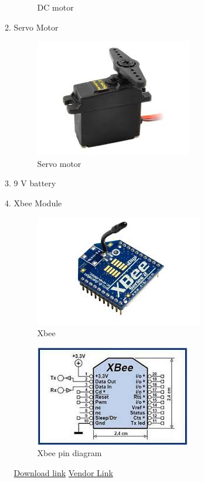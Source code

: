 \documentclass[a4paper,12pt,oneside]{book}
\begin{document}
\begin{itemize}
\begin{enumerate}
\begin{figure}[H]
        \caption{DC motor}
      \end{figure}
      \item Servo Motor
      \begin{figure}[H]
        \centering
        \includegraphics[scale=0.6]{servo}
        \caption{Servo motor}
      \end{figure}
      \item 9 V battery
      \item Xbee Module  \\
      \begin{figure}[H]
        \centering
        \includegraphics[scale=0.6]{Xbee-1}
        \caption{Xbee}
      \end{figure}
      \begin{figure}[H]
        \centering
        \includegraphics[scale=0.6]{Xbee}
        \caption{Xbee pin diagram}
      \end{figure}
      \href{https://www.sparkfun.com/datasheets/Wireless/Zigbee/XBee-Datasheet.pdf} {Download link}
      \href{http://www.amazon.in/XBee-2mW-Wire-Antenna-ZigBee/dp/B007R9U1QA?tag=googinhydr18418-21&tag=googinkenshoo-21&ascsubtag=a4459339-54b9-4883-ac3e-2de2611b95a1} {Vendor Link}

\end{enumerate}
\end{itemize}
\end{document}
